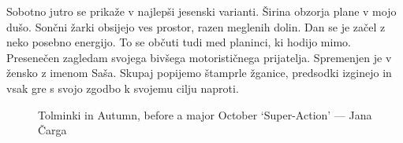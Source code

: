   Sobotno jutro se prikaže v najlepši jesenski varianti. Širina obzorja plane v mojo dušo. Sončni žarki obsijejo ves prostor, razen meglenih dolin. Dan se je začel z neko posebno energijo. To se občuti tudi med planinci, ki hodijo mimo. Presenečen zagledam svojega bivšega motorističnega prijatelja. Spremenjen je v žensko z imenom Saša. Skupaj popijemo štamprle žganice, predsodki izginejo in vsak gre s svojo zgodbo k svojemu cilju naproti. 
  
\begin{figure}[t!]
\checkoddpage \ifoddpage \forcerectofloat \else \forceversofloat \fi
\centering
{}
\caption{Tolminki \protect{} in Autumn, before a major October `Super-Action' --- Jana Čarga }
\label{migovec in autumn}
\end{figure}


